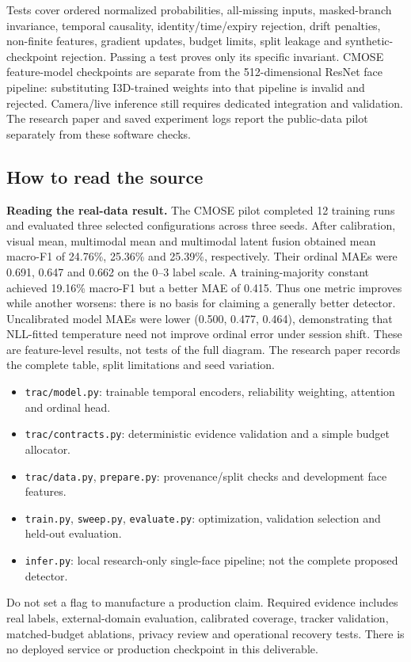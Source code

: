 \documentclass[10pt,a4paper]{article}
\begin{document}
Tests cover ordered normalized probabilities, all-missing inputs, masked-branch invariance, temporal causality, identity/time/expiry rejection, drift penalties, non-finite features, gradient updates, budget limits, split leakage and synthetic-checkpoint rejection. Passing a test proves only its specific invariant. CMOSE feature-model checkpoints are separate from the 512-dimensional ResNet face pipeline: substituting I3D-trained weights into that pipeline is invalid and rejected. Camera/live inference still requires dedicated integration and validation. The research paper and saved experiment logs report the public-data pilot separately from these software checks.

\subsection{How to read the source}
\textbf{Reading the real-data result.} The CMOSE pilot completed 12 training runs and evaluated three selected configurations across three seeds. After calibration, visual mean, multimodal mean and multimodal latent fusion obtained mean macro-F1 of 24.76\%, 25.36\% and 25.39\%, respectively. Their ordinal MAEs were 0.691, 0.647 and 0.662 on the 0--3 label scale. A training-majority constant achieved 19.16\% macro-F1 but a better MAE of 0.415. Thus one metric improves while another worsens: there is no basis for claiming a generally better detector. Uncalibrated model MAEs were lower (0.500, 0.477, 0.464), demonstrating that NLL-fitted temperature need not improve ordinal error under session shift. These are feature-level results, not tests of the full diagram. The research paper records the complete table, split limitations and seed variation.

\begin{itemize}
\item \texttt{trac/model.py}: trainable temporal encoders, reliability weighting, attention and ordinal head.
\item \texttt{trac/contracts.py}: deterministic evidence validation and a simple budget allocator.
\item \texttt{trac/data.py}, \texttt{prepare.py}: provenance/split checks and development face features.
\item \texttt{train.py}, \texttt{sweep.py}, \texttt{evaluate.py}: optimization, validation selection and held-out evaluation.
\item \texttt{infer.py}: local research-only single-face pipeline; not the complete proposed detector.
\end{itemize}
Do not set a flag to manufacture a production claim. Required evidence includes real labels, external-domain evaluation, calibrated coverage, tracker validation, matched-budget ablations, privacy review and operational recovery tests. There is no deployed service or production checkpoint in this deliverable.
\end{document}
